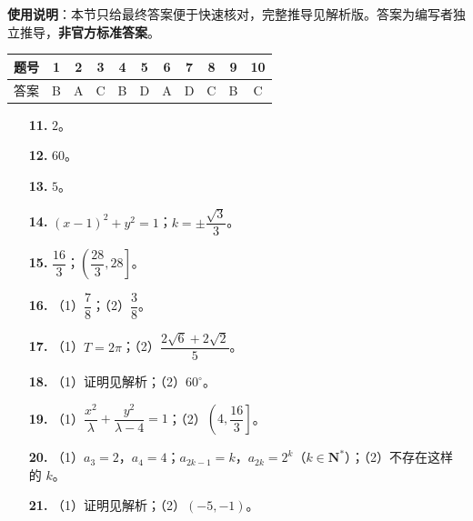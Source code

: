 
\begin{gknotice}
\textbf{使用说明}：本节只给最终答案便于快速核对，完整推导见解析版。答案为编写者独立推导，\textbf{非官方标准答案}。
\end{gknotice}

\begin{center}\begin{tabular}{ccccccccccc}
\toprule
题号 & 1 & 2 & 3 & 4 & 5 & 6 & 7 & 8 & 9 & 10 \\
\midrule
答案 & B & A & C & B & D & A & D & C & B & C \\
\bottomrule
\end{tabular}\end{center}

\begin{itemize}[leftmargin=2.6em]
  \item[\textbf{11.}] $2$。
  \item[\textbf{12.}] $60$。
  \item[\textbf{13.}] $5$。
  \item[\textbf{14.}] $(x-1)^2+y^2=1$；$k=\pm\dfrac{\sqrt3}3$。
  \item[\textbf{15.}] $\dfrac{16}3$；$\left(\dfrac{28}3,28\right]$。
\end{itemize}

\begin{itemize}[leftmargin=2.6em]
  \item[\textbf{16.}] （1）$\dfrac78$；（2）$\dfrac38$。
  \item[\textbf{17.}] （1）$T=2\pi$；（2）$\dfrac{2\sqrt6+2\sqrt2}5$。
  \item[\textbf{18.}] （1）证明见解析；（2）$60^\circ$。
  \item[\textbf{19.}] （1）$\dfrac{x^2}\lambda+\dfrac{y^2}{\lambda-4}=1$；（2）$\left(4,\dfrac{16}3\right]$。
  \item[\textbf{20.}] （1）$a_3=2$，$a_4=4$；$a_{2k-1}=k$，$a_{2k}=2^k$（$k\in\mathbf N^*$）；（2）不存在这样的 $k$。
  \item[\textbf{21.}] （1）证明见解析；（2）$(-5,-1)$。
\end{itemize}

